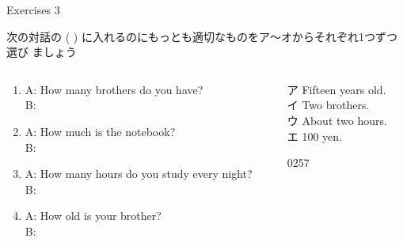\documentclass[aspectratio=169,xcolor={dvipsnames,table}]{beamer}
\begin{document}
\begin{frame}[plain]{Exercises 3}
 
 次の対話の ( ) に入れるのにもっとも適切なものをア～オからそれぞれ1つずつ選び
ましょう
\begin{columns}
\begin{column}{.65\textwidth}
\begin{enumerate}
 \item A: How many brothers do you have?\\
B: 
\item A: How much is the notebook? \\
B:   
 \item  A: How many hours do you study every night?\\ 
B:   
  \item A: How old is your brother?\\
B:  
\end{enumerate} 
\end{column}
\begin{column}{.35\textwidth}
\begin{tcolorbox}
 
ア Fifteen years old.\\
イ Two brothers.\\
ウ About two hours.\\
エ 100 yen.
\end{tcolorbox}
\hfill{\tiny 0257}\,{\scriptsize {}}
\end{column}
\end{columns}
\end{frame}
\end{document}
